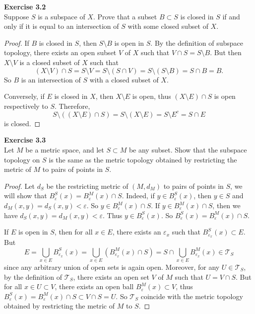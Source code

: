 \documentclass[12pt, a4paper]{article}
\theoremstyle{plain}
\newcommand{\T}{\mathcal{T}}
\def\epsilon{\varepsilon}
\newenvironment{exercise}[2][Exercise]
    { \begin{mdframed}[backgroundcolor=gray!20] \textbf{#1 #2} \\}
    {  \end{mdframed}}
\begin{document}
\begin{exercise}{3.2}
Suppose $S$ is a subspace of $X$. Prove that a subset $B\subset S$ is closed in $S$ if and only if it is equal to an intersection of $S$ with some closed subset of $X$.
\end{exercise}
	\begin{proof}
	If $B$ is closed in $S$, then $S\setminus B$ is open in $S$. By the definition of subspace topology, there exists an open subset $V$ of $X$ such that $V\cap S=S\setminus B$. But then $X\setminus V$ is a closed subset of $X$ such that
	\[
	(X\setminus V)\cap S=S\setminus V=S\setminus (S\cap V)=S\setminus(S\setminus B)=S\cap B=B.
	\]
	So $B$ is an intersection of $S$ with a closed subset of $X$. 
	
	Conversely, if $E$ is closed in $X$, then $X\setminus E$ is open, thus $(X\setminus E)\cap S$ is open respectively to $S$. Therefore,
	\[
	S\setminus ((X\setminus E)\cap S)=S\setminus(X\setminus E)=S\setminus E^c=S\cap E
	\]
	is closed.
	\end{proof}

\begin{exercise}{3.3}
Let $M$ be a metric space, and let $S\subset M$ be any subset. Show that the subspace topology on $S$ is the same as the metric topology obtained by restricting the metric of $M$ to pairs of points in $S$.
\end{exercise}
	\begin{proof}
	Let $d_S$ be the restricting metric of $(M,d_M)$ to pairs of points in $S$, we will show that $B_\epsilon^S(x)=B_\epsilon^M(x)\cap S$. Indeed, if $y\in B_\epsilon^S(x)$, then $y\in S$ and $d_M(x,y)=d_S(x,y)<\epsilon$. So $y\in B_\epsilon^M(x)\cap S$. If $y\in B_\epsilon^M(x)\cap S$, then we have $d_S(x,y)=d_M(x,y)<\epsilon$. Thus $y\in B_\epsilon^S(x)$. So $B_\epsilon^S(x)=B_\epsilon^M(x)\cap S$.
	
	If $E$ is open in $S$, then for all $x\in E$, there exists an $\epsilon_x$ such that $B_{\epsilon_x}^S(x)\subset E$. But
	\[
	E=\bigcup_{x\in E}{B_{\epsilon_x}^S(x)}=\bigcup_{x\in E}{(B_{\epsilon_x}^M(x)\cap S)}=S\cap\bigcup_{x\in E}{B_{\epsilon_x}^M(x)}\in\T_S
	\]
	since any arbitrary union of open sets is again open. Moreover, for any $U\in\T_S$, by the definition of $\T_S$, there exists an open set $V$ of $M$ such that $U=V\cap S$. But for all $x\in U\subset V$, there exists an open ball $B_\epsilon^M(x)\subset V$, thus $B_\epsilon^S(x)=B_\epsilon^M(x)\cap S\subset V\cap S=U$. So $\T_S$ coincide with the metric topology obtained by restricting the metric of $M$ to $S$.
	\end{proof}
\end{document}
